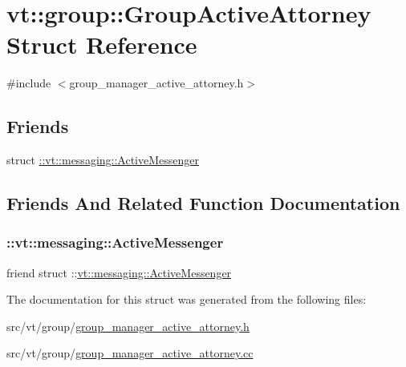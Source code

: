 \hypertarget{structvt_1_1group_1_1_group_active_attorney}{}\section{vt\+:\+:group\+:\+:Group\+Active\+Attorney Struct Reference}
\label{structvt_1_1group_1_1_group_active_attorney}


{\ttfamily \#include $<$group\+\_\+manager\+\_\+active\+\_\+attorney.\+h$>$}

\subsection*{Friends}
\begin{DoxyCompactItemize}
\item 
struct \hyperlink{structvt_1_1group_1_1_group_active_attorney_a31cb499e12b002c0912506ddca0efcaa}{\+::vt\+::messaging\+::\+Active\+Messenger}
\end{DoxyCompactItemize}


\subsection{Friends And Related Function Documentation}
\mbox{\label{structvt_1_1group_1_1_group_active_attorney_a31cb499e12b002c0912506ddca0efcaa}} 
\subsubsection{\texorpdfstring{\+::vt\+::messaging\+::\+Active\+Messenger}{::vt::messaging::ActiveMessenger}}
{\footnotesize\ttfamily friend struct \+::\hyperlink{structvt_1_1messaging_1_1_active_messenger}{vt\+::messaging\+::\+Active\+Messenger}\hspace{0.3cm}{\ttfamily [friend]}}



The documentation for this struct was generated from the following files\+:\begin{DoxyCompactItemize}
\item 
src/vt/group/\hyperlink{group__manager__active__attorney_8h}{group\+\_\+manager\+\_\+active\+\_\+attorney.\+h}\item 
src/vt/group/\hyperlink{group__manager__active__attorney_8cc}{group\+\_\+manager\+\_\+active\+\_\+attorney.\+cc}\end{DoxyCompactItemize}
